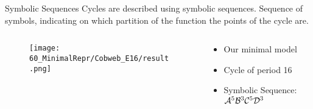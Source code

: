 \begin{frame}{Symbolic Sequences}
	Cycles are described using symbolic sequences.
	Sequence of symbols, indicating on which partition of the function the points of the cycle are.
	\vspace{.5em}
	\begin{columns}
		\hspace{5em}
		\begin{column}{.3 \textwidth}
			\begin{figure}
				\texttt{[image: 60\_MinimalRepr/Cobweb\_E16/result.png]}
			\end{figure}
		\end{column}
		\hspace{3em}
		\begin{column}{.6 \textwidth}
			\begin{itemize}
				\item Our minimal model
				\item Cycle of period 16
				\item Symbolic Sequence: $\mathcal{A}^5\mathcal{B}^3\mathcal{C}^5\mathcal{D}^3$
			\end{itemize}
		\end{column}
	\end{columns}
\end{frame}
